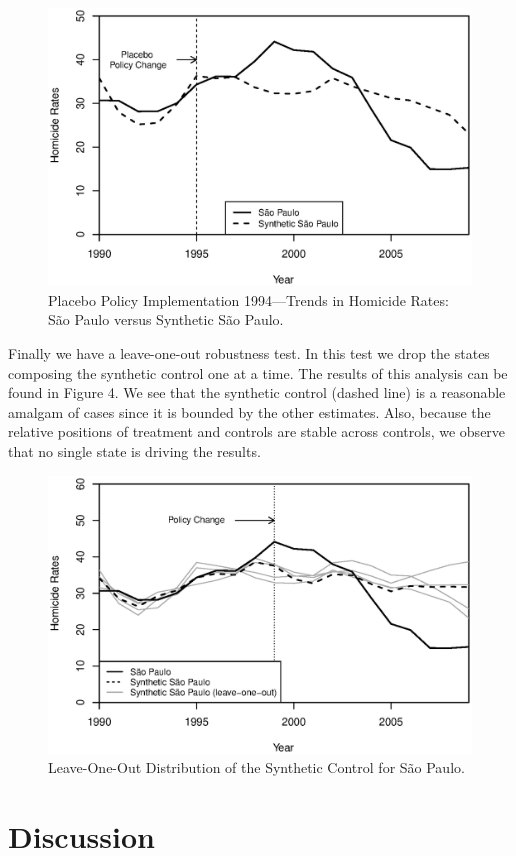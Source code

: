 \documentclass[a4paper,11pt]{article}
\begin{document}
\begin{figure}[htp!]
\begin{center}
\centerline{\includegraphics[width=.6\textwidth]{placebo.eps}}
\caption{Placebo Policy Implementation 1994---Trends in Homicide Rates: S\~{a}o Paulo versus Synthetic S\~{a}o Paulo.}\label{placebo}
\end{center}
\end{figure}

\newpage

Finally we have a leave-one-out robustness test. In this test we drop the states composing the synthetic control one at a time. The results of this analysis can be found in Figure 4. We see that the synthetic control (dashed line) is a reasonable amalgam of cases since it is bounded by the other estimates. Also, because the relative positions of treatment and controls are stable across controls, we observe that no single state is driving the results.

\begin{figure}[htp!]
\begin{center}
\centerline{\includegraphics[width=.6\textwidth]{leave-one-out.eps}}
\caption{Leave-One-Out Distribution of the Synthetic Control for S\~{a}o Paulo.}\label{leave}
\end{center}
\end{figure}

\section{Discussion}
\end{document}
